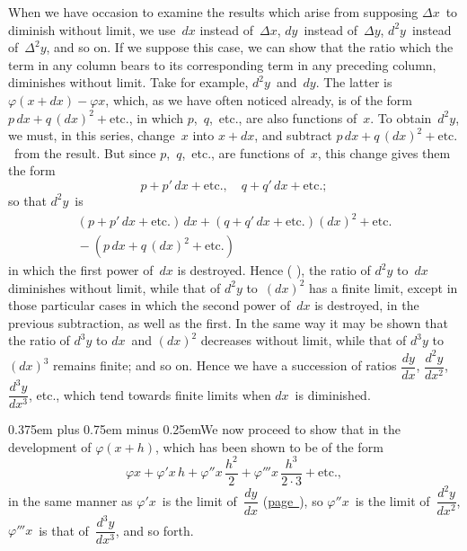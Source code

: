 \documentclass[12pt]{book}[2005/09/16]
\newcommand{\Loosen}{\spaceskip 0.375em plus 0.75em minus 0.25em}
\newcommand{\Pagelabel}[1]{\phantomsection\label{page:#1}}
\newcommand{\PageSep}[1]{\Pagelabel{#1}\ignorespaces}
\newcommand{\PageRef}[2][page]{\hyperref[page:#2]{#1~\pageref*{page:#2}}}
\newcommand{\PageRefs}[3][pages]{%
  \ifthenelse{\equal{\pageref*{page:#2}}{\pageref*{page:#3}}}{%
    \hyperref[page:#2]{page~\pageref*{page:#2}}%
  }{%
    #1 \hyperref[page:#2]{\pageref*{page:#2}}--\hyperref[page:#3]{\pageref*{page:#3}}%
  }%
}
\renewcommand{\etc}{\text{etc}}
\renewcommand{\(}{{\upshape(}}
\renewcommand{\)}{{\upshape)}}
\renewcommand{\phi}{\varphi}
\begin{document}
When we have occasion to examine the results
which arise from supposing $\Delta x$~to diminish without
limit, we use~$dx$ instead of~$\Delta x$, $dy$~instead of~$\Delta y$, $d^{2} y$~instead
of~$\Delta^{2} y$, and so on. If we suppose this case, we
can show that the ratio which the term in any column
bears to its corresponding term in any preceding column,
diminishes without limit. Take for example,
$d^{2} y$~and~$dy$. The latter is $\phi(x + dx) - \phi x$, which, as
we have often noticed already, is of the form $p\, dx + q\, (dx)^{2} + \etc.$,
in which $p$,~$q$,~etc., are also functions
of~$x$. To obtain~$d^{2} y$, we must, in this series, change~$x$
into $x + dx$, and subtract $p\, dx + q\, (dx)^{2} + \etc.$\ from
the result. But since $p$,~$q$,~etc., are functions of~$x$,
this change gives them the form
\[
p + p'\, dx + \etc.,\quad
q + q'\, dx + \etc.;
\]
so that $d^{2} y$~is
\begin{gather*}
(p + p'\, dx + \etc.)\, dx + (q + q'\, dx + \etc.)(dx)^{2} + \etc. \\
{} - (p\, dx + q\, (dx)^{2} + \etc.)
\end{gather*}
in which the first power of~$dx$ is destroyed. Hence
(\PageRefs{42}{44}), the ratio of $d^{2} y$ to~$dx$ diminishes without
limit, while that of $d^{2} y$ to~$(dx)^{2}$ has a finite limit,
except in those particular cases in which the second
power of~$dx$ is destroyed, in the previous subtraction,
as well as the first. In the same way it may be shown
that the ratio of $d^{3} y$ to $dx$~and $(dx)^{2}$ decreases without
limit, while that of $d^{3} y$ to~$(dx)^{3}$ remains finite; and so
\PageSep{92}
on. Hence we have a succession of ratios $\dfrac{dy}{dx}$, $\dfrac{d^{2} y}{dx^{2}}$, $\dfrac{d^{3} y}{dx^{3}}$,
etc., which tend towards finite limits when $dx$~is diminished.

{\Loosen We now proceed to show that in the development
of $\phi(x + h)$, which has been shown to be of the form}
\[
\phi x + \phi' x\, h
       + \phi'' x\, \frac{h^{2}}{2}
       + \phi''' x\, \frac{h^{3}}{2·3} + \etc.,
\]
in the same manner as $\phi' x$~is the limit of~$\dfrac{dy}{dx}$ (\PageRef{23}),
so $\phi'' x$~is the limit of~$\dfrac{d^{2} y}{dx^{2}}$, $\phi''' x$~is that of~$\dfrac{d^{3} y}{dx^{3}}$, and so
forth.
\end{document}
